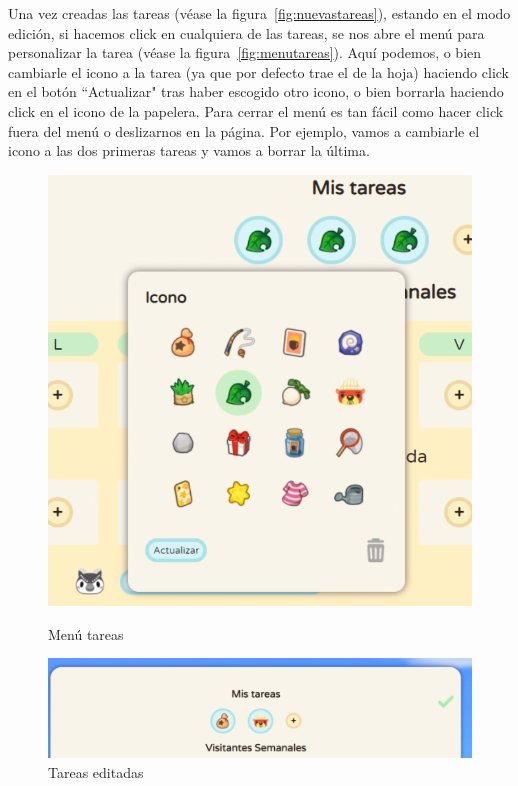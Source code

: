 \clearpage


Una vez creadas las tareas {(v\'ease la figura~\ref{fig:nuevastareas})}, estando en el modo edición, si hacemos click en cualquiera de las tareas, se nos abre el menú para personalizar la tarea {(v\'ease la figura~\ref{fig:menutareas})}. Aquí podemos, o bien cambiarle el icono a la tarea (ya que por defecto trae el de la hoja) haciendo click en el botón ``Actualizar" tras haber escogido otro icono, o bien borrarla haciendo click en el icono de la papelera. Para cerrar el menú es tan fácil como hacer click fuera del menú o deslizarnos en la página. Por ejemplo, vamos a cambiarle el icono a las dos primeras tareas y vamos a borrar la última.\\

\begin{figure}[!htb]
	\begin{minipage}{0.48\textwidth}
		\centering
		\includegraphics[width=.6\linewidth]{img/cap9/33-menu-tareas.png}
		\caption{Menú tareas}
		\label{fig:menutareas}
	\end{minipage}\hfill
	\begin{minipage}{0.48\textwidth}
		\centering
		\includegraphics[width=\linewidth]{img/cap9/34-dos-tareas.png}
		\caption{Tareas editadas}
		\label{fig:tareaseditadas}
	\end{minipage}
\end{figure}

